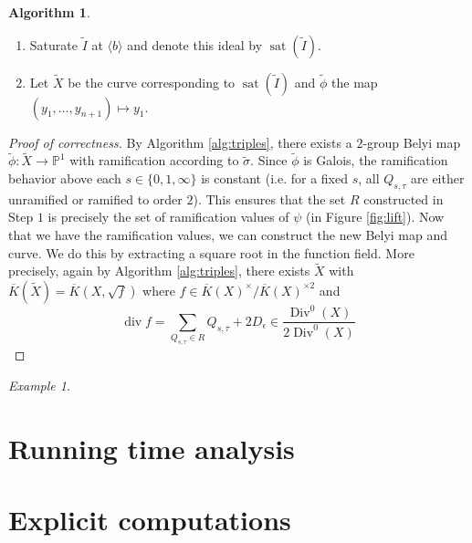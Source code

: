 \documentclass{dcthesis}
\newcommand{\PP}{\mathbb P}
\newcommand{\wt}[1]{\widetilde{#1}}
\newcommand{\Kbar}{\overline{K}}
\DeclareMathOperator{\Div}{Div}
\DeclareMathOperator{\ddiv}{div}
\DeclareMathOperator{\sat}{sat}
\theoremstyle{definition}
\newtheorem{alg}[prop]{Algorithm}
\theoremstyle{remark}
\newtheorem{example}[prop]{Example}
\numberwithin{equation}{section}
\numberwithin{figure}{section}
\begin{document}
{{\begin{alg}
\begin{enumerate}
          \[
            \wt{I}\colonequals\langle g_1,\dots,g_k, by_{n+1}^2-a\rangle
          \]
          in $\Kbar[y_1,\dots,y_n,y_{n+1}]$.
        \item
          Saturate $\wt{I}$ at $\langle b\rangle$ and denote this ideal by $\sat(\wt{I})$.
        \item
          Let $\wt{X}$ be the curve corresponding to $\sat(\wt{I})$ and
          $\wt{\phi}$ the map $(y_1,\dots,y_{n+1})\mapsto y_1$.
      \end{enumerate}
    \end{alg}
    \begin{proof}[Proof of correctness]
      By Algorithm \ref{alg:triples},
      there exists a $2$-group Belyi map $\wt{\phi}:\wt{X}\to\PP^1$
      with ramification according to $\wt{\sigma}$.
      Since $\wt{\phi}$ is Galois,
      the ramification behavior above each $s\in\{0,1,\infty\}$
      is constant
      (i.e. for a fixed $s$, all $Q_{s,\tau}$ are either unramified or
      ramified to order $2$).
      This ensures that the set $R$ constructed in Step $1$
      is precisely the set of ramification values of $\psi$
      (in Figure \ref{fig:lift}).
      Now that we have the ramification values,
      we can construct the new Belyi map and curve.
      We do this by extracting a square root in the function field.
      More precisely,
      again by Algorithm \ref{alg:triples},
      there exists $\wt{X}$
      with $\Kbar(\wt{X}) = \Kbar(X,\sqrt{f})$
      where $f\in\Kbar(X)^\times/\Kbar(X)^{\times 2}$
      and
      \begin{equation}\label{eqn:classgroup}
        \ddiv f= \sum_{Q_{s,\tau}\in R} Q_{s,\tau}+2D_\epsilon
        \in\frac{\Div^0(X)}{2\Div^0(X)}
      \end{equation}
    \end{proof}
    \begin{example}
    \end{example}
  }
  \section{Running time analysis}{\label{sec:runtime}
  }
  \section{Explicit computations}{\label{sec:computations}
  }
} 
\end{document}
